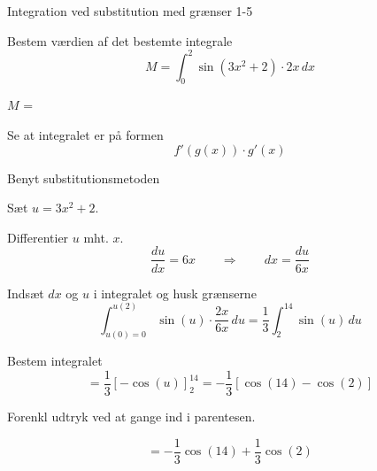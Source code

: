 \documentclass{article}
\begin{document}
\newpage

\begin{exercise}{Integration ved substitution med grænser 1-5}


Bestem værdien af det bestemte integrale
\[
M = \int_0^2 \sin(3x^2 + 2) \cdot 2x \, dx
\]

$M$ = 



\hint

Se at integralet er på formen
\[
f'(g(x)) \cdot g'(x)
\]

\hint

Benyt substitutionsmetoden

\hint

Sæt $u=3x^2 + 2$.


\hint

Differentier $u$ mht. $x$.
\[
\frac{du}{dx} = 6x \qquad\Rightarrow \qquad dx = \frac{du}{6x}
\]

\hint

Indsæt $dx$ og $u$ i integralet og husk grænserne
\[
\int_{u(0)=0}^{u(2)} \sin(u) \cdot \frac{2x}{6x} \, du = \frac{1}{3} \int_2^{14} \sin(u) \, du
\]

\hint

Bestem integralet
\[
= \frac{1}{3} \left[ - \cos(u) \right]_2^{14} = - \frac{1}{3} \left[ \cos(14) - \cos(2) \right]
\]

\hint
Forenkl udtryk ved at gange ind i parentesen.

\hint

\[
= - \frac{1}{3} \cos(14) + \frac{1}{3} \cos(2)
\]


\end{exercise}

\newpage
\end{document}
